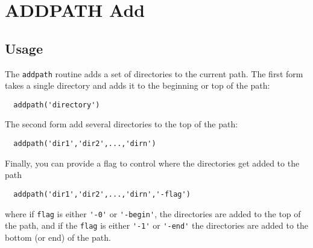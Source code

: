 \section{ADDPATH Add}

\subsection{Usage}

The \verb|addpath| routine adds a set of directories to the current path.
The first form takes a single directory and adds it to the beginning
or top of the path:
\begin{verbatim}
  addpath('directory')
\end{verbatim}
The second form add several directories to the top of the path:
\begin{verbatim}
  addpath('dir1','dir2',...,'dirn')
\end{verbatim}
Finally, you can provide a flag to control where the directories get
added to the path
\begin{verbatim}
  addpath('dir1','dir2',...,'dirn','-flag')
\end{verbatim}
where if \verb|flag| is either \verb|'-0'| or \verb|'-begin'|, the directories are
added to the top of the path, and if the \verb|flag| is either \verb|'-1'| or 
\verb|'-end'| the directories are added to the bottom (or end) of the path.
